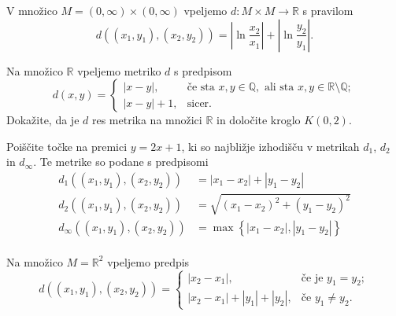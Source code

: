\documentclass[11pt,a4paper]{exam}
\renewcommand{\{}{\lbrace}
\renewcommand{\}}{\rbrace}
\begin{document}
\begin{questions}
		

	\question	V množico $M=(0,\infty) \times (0, \infty)$ vpeljemo $d: M \times M \to \mathbb{R}$ s pravilom \[d\left( (x_{1},y_{1}), (x_{2},y_{2}) \right) = \left| \ln \frac{x_{2}}{x_{1}} \right| + \left| \ln \frac{y_{2}}{y_{1}} \right|.\]


		\question Na množico $\mathbb{R}$ vpeljemo metriko $d$ s predpisom 
		\[d(x,y) = 
			\begin{cases}
				|x-y|, & \text{če sta } x,y \in \mathbb{Q}, \text{ ali sta } x,y  \in \mathbb{R} \setminus \mathbb{Q}; \\ 
				|x-y|+1, & \text{sicer}.
			\end{cases}
		\]
		Dokažite, da je $d$ res metrika na množici $\mathbb{R}$ in določite kroglo $K(0,2)$.

		\question Poiščite točke na premici $y = 2x +1$, ki so najbližje izhodišču v metrikah $d_{1}$, $d_{2}$ in $d_{\infty}$.
		Te metrike so podane s predpisomi
		\begin{align*}
			d_{1}\left( (x_{1}, y_{1}), (x_{2}, y_{2}) \right) &= |x_{1} - x_{2}| + |y_{1} - y_{2}| \\
			d_{2}\left( (x_{1}, y_{1}), (x_{2}, y_{2}) \right) &= \sqrt{(x_{1} - x_{2})^{2} + (y_{1} - y_{2})^{2}} \\
			d_{\infty}\left( (x_{1}, y_{1}), (x_{2}, y_{2}) \right) &= \max\left\{ |x_{1} - x_{2}|, |y_{1} - y_{2}| \right\}\\
		\end{align*}

		\question Na množico $M = \mathbb{R}^{2}$ vpeljemo predpis 
		\[d\left( (x_{1}, y_{1}), (x_{2}, y_{2}) \right)=
		\begin{cases}
			|x_{2} - x_{1}|, &\text{če je } y_{1} = y_{2}; \\
			|x_{2} - x_{1}| + |y_{1}| + |y_{2}|, & \text{če } y_{1} \neq y_{2}.
		\end{cases}
		\]
		\begin{parts}

\end{parts}
\end{questions}
\end{document}
